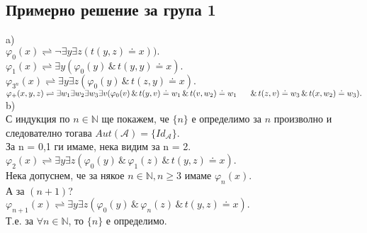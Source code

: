 \documentclass{article}
\begin{document}
\subsection{Примерно решение за група 1}
\begin{addmargin}[1em]{2em}
a) \\
$ \varphi_{0}(x) \rightleftharpoons \neg \exists y \exists z (t(y, z) \doteq x)). $\\
$ \varphi_{1}(x) \rightleftharpoons \exists y (\varphi_{0}(y) \, \& \, t(y, y) \doteq x). $\\
$ \varphi_{3^n}(x) \rightleftharpoons \exists y \exists z (\varphi_{0}(y) \, \& \, t(z, y) \doteq x). $\\
$ \varphi_{+}(x, y, z) \rightleftharpoons \exists w_1 \exists w_2 \exists w_3 \exists v (\varphi_{0}(v) \, \&  \, t(y, v) \doteq w_1 \, \& \, t(v, w_2) \doteq w_1 \\ \indent \, \& \, t(z, v) \doteq w_3 \, \& \, t(x, w_2) \doteq w_3).$ \\
b) \\
С индукция по $n \in \mathbb{N}$ ще покажем, че $\{n\}$ е определимо за $n$ произволно и следователно тогава $Aut(\mathcal{A})= \{Id_{\mathcal{A}}\}$.\\
За n = 0,1 ги имаме, нека видим за n = 2.\\
$ \varphi_{2}(x) \rightleftharpoons \exists y \exists z (\varphi_{0}(y) \, \& \, \varphi_{1}(z) \, \& \, t(y, z) \doteq x). $\\
Нека допуснем, че за някое $n \in \mathbb{N}, n \geq 3$ имаме $\varphi_{n}(x)$.\\
А за $(n+1)$?\\
$ \varphi_{n+1}(x) \rightleftharpoons \exists y \exists z (\varphi_{0}(y) \, \& \, \varphi_{n}(z) \, \& \, t(y, z) \doteq x). $\\
Т.е. за $\forall n \in \mathbb{N}$, то $\{n\}$ е определимо.
\end{addmargin}

\vskip 0.2in
\end{document}
